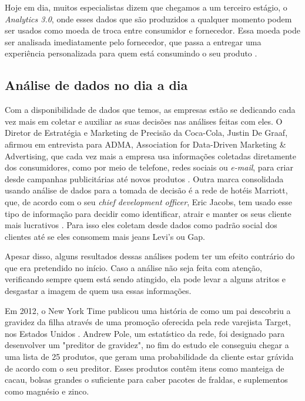 \indent
\par Hoje em dia, muitos especialistas dizem que chegamos a um terceiro estágio, o \textit{Analytics 3.0}, onde esses dados que são produzidos a qualquer momento podem ser usados como moeda de troca entre consumidor e fornecedor. Essa moeda pode ser analisada imediatamente pelo fornecedor, que passa a entregar uma experiência personalizada para quem está consumindo o seu produto \cite{Villanova}.

\subsection{Análise de dados no dia a dia}

\indent
\par Com a disponibilidade de dados que temos, as empresas estão se dedicando cada vez mais em coletar e auxiliar as suas decisões nas análises feitas com eles. O Diretor de Estratégia e Marketing de Precisão da Coca-Cola, Justin De Graaf, afirmou em entrevista para ADMA, Association for Data-Driven Marketing \& Advertising, que cada vez mais a empresa usa informações coletadas diretamente dos consumidores, como por meio de telefone, redes sociais ou \textit{e-mail}, para criar desde campanhas publicitárias até novos produtos \cite{Tan2017}. Outra marca consolidada usando análise de dados para a tomada de decisão é a rede de hotéis Marriott, que, de acordo com o seu \textit{chief development officer}, Eric Jacobs, tem usado esse tipo de informação para decidir como identificar, atrair e manter os seus cliente mais lucrativos \cite{Eisen2018}. Para isso eles coletam desde dados como padrão social dos clientes até se eles consomem mais jeans Levi's ou Gap.

\par Apesar disso, alguns resultados dessas análises podem ter um efeito contrário do que era pretendido no início. Caso a análise não seja feita com atenção, verificando sempre quem está sendo atingido, ela pode levar a alguns atritos e desgastar a imagem de quem usa essas informações.

\par Em 2012, o New York Time publicou uma história de como um pai descobriu a gravidez da filha através de uma promoção oferecida pela rede varejista Target, nos Estados Unidos \cite{Duhigg2012}. Andrew Pole, um estatístico da rede, foi designado para desenvolver um "preditor de gravidez", no fim do estudo ele conseguiu chegar a uma lista de 25 produtos, que geram uma probabilidade da cliente estar grávida de acordo com o seu preditor. Esses produtos contêm itens como manteiga de cacau, bolsas grandes o suficiente para caber pacotes de fraldas, e suplementos como magnésio e zinco.

